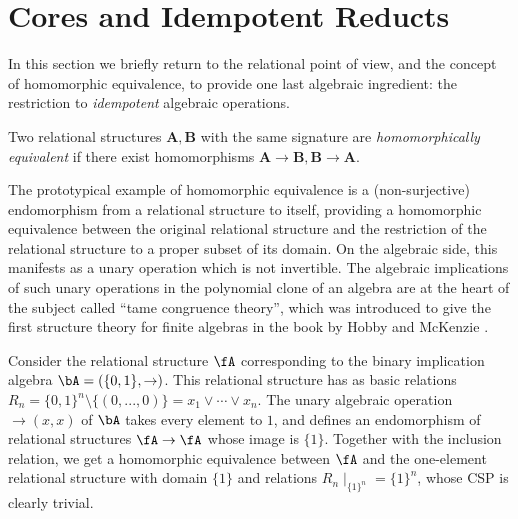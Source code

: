 



\section{Cores and Idempotent Reducts}

In this section we briefly return to the relational point of view, and the concept of homomorphic equivalence, to provide one last algebraic ingredient: the restriction to \emph{idempotent} algebraic operations.

\begin{defn} Two relational structures $\mathbf{A}, \mathbf{B}$ with the same signature are \emph{homomorphically equivalent} if there exist homomorphisms $\mathbf{A} \rightarrow \mathbf{B}, \mathbf{B} \rightarrow \mathbf{A}$.
\end{defn}

The prototypical example of homomorphic equivalence is a (non-surjective) endomorphism from a relational structure to itself, providing a homomorphic equivalence between the original relational structure and the restriction of the relational structure to a proper subset of its domain. On the algebraic side, this manifests as a unary operation which is not invertible. The algebraic implications of such unary operations in the polynomial clone of an algebra are at the heart of the subject called ``tame congruence theory'', which was introduced to give the first structure theory for finite algebras in the book by Hobby and McKenzie \cite{hobby-mckenzie}.

\begin{ex} Consider the relational structure $\fA$ corresponding to the binary implication algebra $\bA = (\{0,1\}, \to)$. This relational structure has as basic relations $R_n = \{0,1\}^n \setminus \{(0, ..., 0)\} = x_1 \vee \cdots \vee x_n$. The unary algebraic operation $\operatorname{\to}(x,x)$ of $\bA$ takes every element to $1$, and defines an endomorphism of relational structures $\fA \rightarrow \fA$ whose image is $\{1\}$. Together with the inclusion relation, we get a homomorphic equivalence between $\fA$ and the one-element relational structure with domain $\{1\}$ and relations $R_n \mid_{\{1\}^n} = \{1\}^n$, whose CSP is clearly trivial.
\end{ex}

